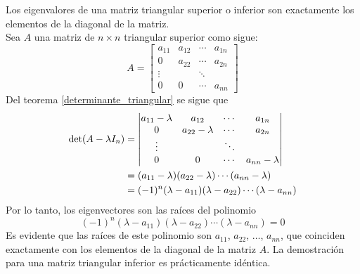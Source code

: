 \begin{theorem}
    Los eigenvalores de una matriz triangular superior o inferior son exactamente los elementos de la diagonal de la matriz. \\
    \demostracion Sea $A$ una matriz de $n \times n$ triangular superior como sigue:
    $$A = \begin{bmatrix}
        a_{11} & a_{12} & \cdots & a_{1n} \\
        0 & a_{22} & \cdots & a_{2n} \\
        \vdots & & \ddots & \\
        0 & 0 & \cdots & a_{nn}
    \end{bmatrix}$$
    Del teorema \ref{determinante_triangular} se sigue que
    \begin{align*}
        \operatorname{det} (A - \lambda I_n) & = \begin{vmatrix}
            a_{11} - \lambda & a_{12} & \cdots & a_{1n} \\
            0 & a_{22} - \lambda & \cdots & a_{2n} \\
            \vdots & & \ddots & \\
            0 & 0 & \cdots & a_{nn} - \lambda
        \end{vmatrix} \\
        & = (a_{11} - \lambda)(a_{22} - \lambda) \cdots (a_{nn} - \lambda) \\
        & = (-1)^n (\lambda - a_{11})(\lambda - a_{22}) \cdots (\lambda - a_{nn})
    \end{align*}
    Por lo tanto, los eigenvectores son las raíces del polinomio
    $$(-1)^n (\lambda - a_{11})(\lambda - a_{22}) \cdots (\lambda - a_{nn}) = 0$$
    Es evidente que las raíces de este polinomio son $a_{11}$, $a_{22}$, $\dots$, $a_{nn}$, que coinciden exactamente con los elementos de la diagonal de la matriz $A$. La demostración para una matriz triangular inferior es prácticamente idéntica.
\end{theorem}

\newpage

